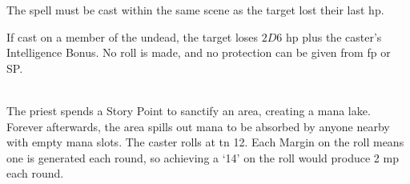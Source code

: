 \begin{multicols}{2}
The spell must be cast within the same scene as the target lost their last \gls{hp}.

If cast on a member of the undead, the target loses $2D6$ \gls{hp} plus the caster's Intelligence Bonus.
No roll is made, and no protection can be given from \gls{fp} or \gls{SP}.

\\
The priest spends a Story Point to sanctify an area, creating a mana lake.
Forever afterwards, the area spills out mana to be absorbed by anyone nearby with empty mana slots.
The caster rolls at \gls{tn} 12.
Each Margin on the roll means one  is generated each round, so achieving a `14' on the roll would produce 2 \gls{mp} each round.

\end{multicols}


